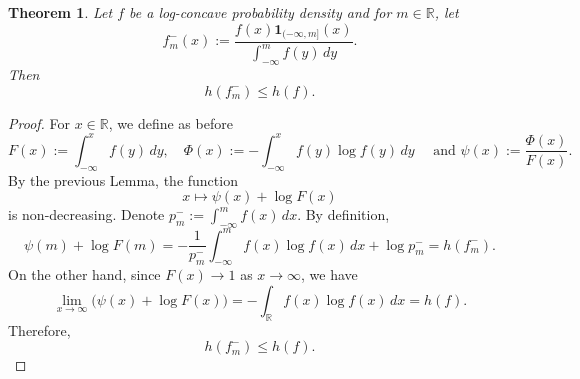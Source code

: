\documentclass{article}
\theoremstyle{plain}
\newtheorem{theorem}{Theorem}
\theoremstyle{definition}
\newcommand{\RL}{\mathbb{R}}
\newcommand{\1}{\mathbf 1}
\begin{document}




\begin{theorem}\label{entropygrunbaumTh}
Let $f$ be a log-concave probability density and for $m \in \RL$, let 
\[
f_{m}^-(x):=\frac{f(x)\mathbf 1_{(-\infty,m]}(x)}{\int_{-\infty}^{m} f(y)\,dy}.
\]
Then
\[
h(f_{m}^-)\le h(f).
\]
\end{theorem}

\begin{proof}  For \(x\in\mathbb R\), we define as before
\[
F(x):=\int_{-\infty}^x f(y)\,dy,\quad
\Phi(x):=-\int_{-\infty}^x f(y)\log f(y)\,dy \quad \text{ and } 
\psi(x):=\frac{\Phi(x)}{F(x)}.
\]
By the previous Lemma, the function
\[
x\mapsto \psi(x)+\log F(x)
\]
is non-decreasing. Denote $p_m^{-}:=\int_{-\infty}^{m} f(x)\,dx$. By definition, 
\[
\psi(m)+\log F(m)
=
-\frac1{p_m^{-}}\int_{-\infty}^m f(x)\log f(x)\,dx+\log p_m^{-}
=
h(f_{m}^-).
\]
On the other hand, since \(F(x)\to1\) as \(x\to\infty\), we have
\[
\lim_{x\to\infty}\big(\psi(x)+\log F(x)\big)
=
-\int_{\mathbb R} f(x)\log f(x)\,dx
=
h(f).
\]
Therefore,
\[
h(f_{m}^-)\le h(f).
\]


\end{proof}
\end{document}
